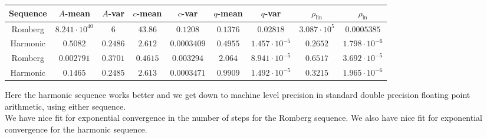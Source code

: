 \begin{table}[H]
    \centering
    \small
    \begin{tabular}{c||c|c|c|c|c|c|c|c}
Sequence & \(A\)-mean & \(A\)-var & \(c\)-mean & \(c\)-var & \(q\)-mean & \(q\)-var & \(\rho_{\operatorname{lin}}\) & \(\rho_{\ln}\)\\\hline
\rowcolor{red}
Romberg & \(8.241\cdot 10^{40}\) & \(6\) & \(43.86\) & \(0.1208\) & \(0.1376\) & \(0.02818\) & \(3.087\cdot 10^5\) & \(0.0005385\) \\
\rowcolor{green}
Harmonic & \(0.5082\) & \(0.2486\) & \(2.612\) & \(0.0003409\) & \(0.4955\) & \(1.457\cdot 10^{-5}\) & \(0.2652\) & \(1.798\cdot 10^{-6}\) \\
\rowcolor{green}
Romberg & \(0.002791\) & \(0.3701\) & \(0.4615\) & \(0.003294\) & \(2.064\) & \(8.941\cdot 10^{-5}\) & \(0.6517\) & \(3.692\cdot 10^{-5}\) \\
\rowcolor{green}
Harmonic & \(0.1465\) & \(0.2485\) & \(2.613\) & \(0.0003471\) & \(0.9909\) & \(1.492\cdot 10^{-5}\) & \(0.3215\) & \(1.965 \cdot 10^{-6}\) \\
    \end{tabular}
    \label{tab:my_label}
\end{table}

Here the harmonic sequence works better and we get down to machine level precision in standard double precision floating point arithmetic, using either sequence.\\

We have nice fit for exponential convergence in the number of steps for the Romberg sequence. We also have nice fit for exponential convergence for the harmonic sequence.

